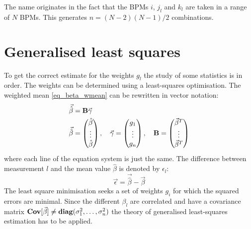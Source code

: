 The name originates in the fact that the BPMs $i$, $j_l$ and $k_l$ are taken in a range of $N$ BPMs.
This generates $n = (N-2)(N-1)/2$ combinations.

\section{Generalised least squares}

To get the correct estimate for the weights $g_l$ the study of some statistics is in order.
The weights can be determined using a least-squares optimisation. The weighted mean \eqref{eq_beta_wmean}
can be rewritten in vector notation:
%
\begin{align}
    \vec{\hat{\beta}} &= \mathbf{B}\vec{\gamma}
    \label{eq_beta_wmean_vec}\\
    \vec{\hat{\beta}} &= 
    \begin{pmatrix}
        \hat{\beta}\\
        \vdots\\
        \hat{\beta}
    \end{pmatrix},\quad
    \vec{\gamma} =
    \begin{pmatrix}
        g_1\\
        \vdots\\
        g_n
    \end{pmatrix},\quad
    \mathbf{B} =
    \begin{pmatrix}
        \vec{\beta}^T\\
        \vdots\\
        \vec{\beta}^T
    \end{pmatrix}
\end{align}
%
where each line of the equation system is just the same.
The difference between measurement $l$ and the mean value $\hat{\beta}$ is denoted by $\epsilon_l$:
%
\begin{equation}
    \vec{\epsilon} = \vec{\hat{\beta}} - \vec{\beta}
\end{equation}
%
The least square minimisation seeks a set of weights $g_i$ for which the squared errors are minimal. Since the different $\beta_l$
are correlated and have a covariance matrix $\mathbf{Cov}[\vec{\beta}] \neq \mathbf{diag}(\sigma_1^2, \ldots, \sigma_n^2)$
the theory of generalised least-squares estimation has to be applied.

